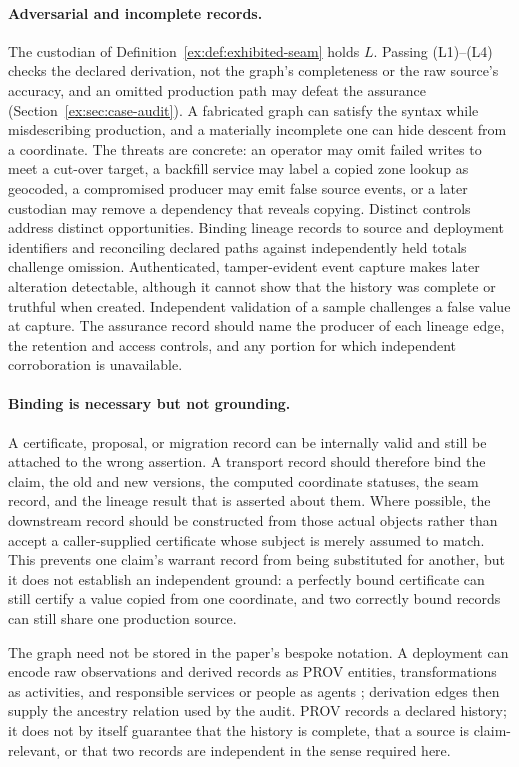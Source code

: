 \documentclass[smallextended,envcountsect,envcountsame,natbib]{svjour3}
\begin{document}
\paragraph{Adversarial and incomplete records.} The custodian of Definition~\ref{ex:def:exhibited-seam} holds $L$. Passing (L1)--(L4) checks the declared derivation, not the graph's completeness or the raw source's accuracy, and an omitted production path may defeat the assurance (Section~\ref{ex:sec:case-audit}). A fabricated graph can satisfy the syntax while misdescribing production, and a materially incomplete one can hide descent from a coordinate. The threats are concrete: an operator may omit failed writes to meet a cut-over target, a backfill service may label a copied zone lookup as geocoded, a compromised producer may emit false source events, or a later custodian may remove a dependency that reveals copying. Distinct controls address distinct opportunities. Binding lineage records to source and deployment identifiers and reconciling declared paths against independently held totals challenge omission. Authenticated, tamper-evident event capture makes later alteration detectable, although it cannot show that the history was complete or truthful when created. Independent validation of a sample challenges a false value at capture. The assurance record should name the producer of each lineage edge, the retention and access controls, and any portion for which independent corroboration is unavailable.

\paragraph{Binding is necessary but not grounding.}
A certificate, proposal, or migration record can be internally valid and still be attached to the wrong assertion. A transport record should therefore bind the claim, the old and new versions, the computed coordinate statuses, the seam record, and the lineage result that is asserted about them. Where possible, the downstream record should be constructed from those actual objects rather than accept a caller-supplied certificate whose subject is merely assumed to match. This prevents one claim's warrant record from being substituted for another, but it does not establish an independent ground: a perfectly bound certificate can still certify a value copied from one coordinate, and two correctly bound records can still share one production source.

The graph need not be stored in the paper's bespoke notation. A deployment can encode raw observations and derived records as PROV entities, transformations as activities, and responsible services or people as agents \citep{w3cprovdm2013}; derivation edges then supply the ancestry relation used by the audit. PROV records a declared history; it does not by itself guarantee that the history is complete, that a source is claim-relevant, or that two records are independent in the sense required here.
\end{document}

